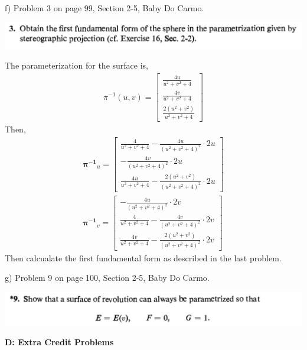 \documentclass[10pt,letterpaper]{hmcpset}
\begin{document}
\newpage
\begin{problem}
f) Problem 3 on page 99, Section 2-5, Baby Do Carmo.

\includegraphics[scale=0.7]{Cf.png}
\end{problem}
The parameterization for the surface is,
\begin{align*}
  \pi^{-1}(u, v) = \begin{bmatrix}
    \frac{4u}{u^2 + v^2 + 4} \\
    \frac{4v}{u^2 + v^2 + 4} \\
    \frac{2(u^2 + v^2)}{u^2 + v^2 + 4}
    \end{bmatrix}
\end{align*}
Then,
\begin{align*}
  \boldsymbol{\pi^{-1}}_u = \begin{bmatrix}
    \frac{4}{u^2 + v^2 + 4} - \frac{4u}{(u^2 + v^2 + 4)^2} \cdot 2u \\
    -\frac{4v}{(u^2 + v^2 + 4)^2} \cdot 2u \\
    \frac{4u}{u^2 + v^2 + 4} - \frac{2(u^2 + v^2)}{(u^2 + v^2 + 4)^2} \cdot 2u
  \end{bmatrix} \\
  \boldsymbol{\pi^{-1}}_v = \begin{bmatrix}
    -\frac{4u}{(u^2 + v^2 + 4)^2} \cdot 2v \\
    \frac{4}{u^2 + v^2 + 4} - \frac{4v}{(u^2 + v^2 + 4)^2} \cdot 2v \\
    \frac{4v}{u^2 + v^2 + 4} - \frac{2(u^2 + v^2)}{(u^2 + v^2 + 4)^2} \cdot 2v
  \end{bmatrix}
\end{align*}
Then calcualate the first fundamental form as described in the last problem. 
\newpage
\begin{problem}
g) Problem 9 on page 100, Section 2-5, Baby Do Carmo.

\includegraphics[scale=0.7]{Cg.png}
\end{problem}
%
%
\newpage
\textbf{D: Extra Credit Problems}
\end{document}
